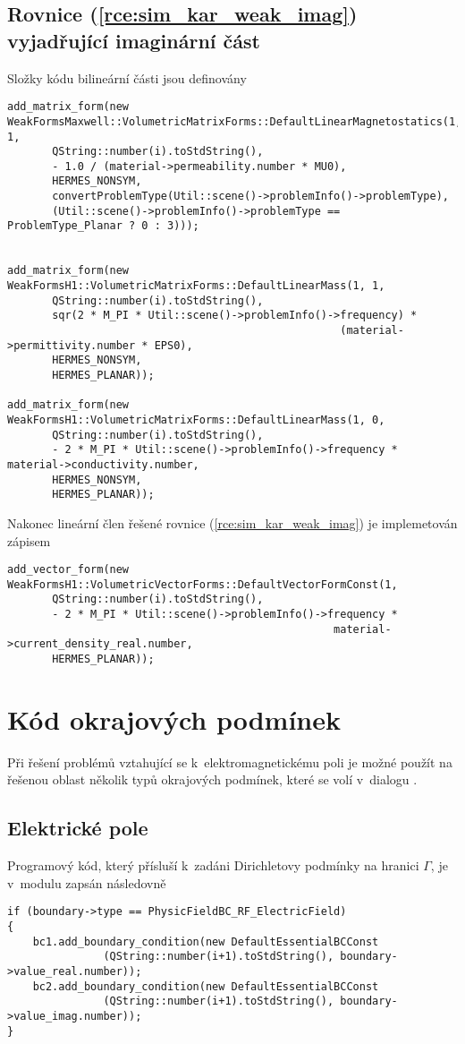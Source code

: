 \subsection*{Rovnice (\ref{rce:sim_kar_weak_imag}) vyjadřující imaginární část}
Složky kódu bilineární části jsou definovány
\begin{verbatim}
add_matrix_form(new WeakFormsMaxwell::VolumetricMatrixForms::DefaultLinearMagnetostatics(1, 1,
       QString::number(i).toStdString(),
       - 1.0 / (material->permeability.number * MU0),
       HERMES_NONSYM,
       convertProblemType(Util::scene()->problemInfo()->problemType),
       (Util::scene()->problemInfo()->problemType == ProblemType_Planar ? 0 : 3)));


add_matrix_form(new WeakFormsH1::VolumetricMatrixForms::DefaultLinearMass(1, 1,
       QString::number(i).toStdString(),
       sqr(2 * M_PI * Util::scene()->problemInfo()->frequency) *
                                                    (material->permittivity.number * EPS0),
       HERMES_NONSYM,
       HERMES_PLANAR));
       
add_matrix_form(new WeakFormsH1::VolumetricMatrixForms::DefaultLinearMass(1, 0,
       QString::number(i).toStdString(),
       - 2 * M_PI * Util::scene()->problemInfo()->frequency * material->conductivity.number,
       HERMES_NONSYM,
       HERMES_PLANAR));
\end{verbatim}
Nakonec lineární člen řešené rovnice (\ref{rce:sim_kar_weak_imag}) je implemetován zápisem
\begin{verbatim}
add_vector_form(new WeakFormsH1::VolumetricVectorForms::DefaultVectorFormConst(1,
       QString::number(i).toStdString(),
       - 2 * M_PI * Util::scene()->problemInfo()->frequency * 
                                                   material->current_density_real.number,
       HERMES_PLANAR));
\end{verbatim}

\section{Kód okrajových podmínek}
Při řešení problémů vztahující se k~elektromagnetickému poli je možné použít na řešenou oblast několik typů okrajových podmínek, které se volí v~dialogu . 

\subsection*{Elektrické pole}
Programový kód, který přísluší k~zadáni Dirichletovy podmínky na hranici $\Gamma$, je v~modulu zapsán následovně
\begin{verbatim}
if (boundary->type == PhysicFieldBC_RF_ElectricField)
{
    bc1.add_boundary_condition(new DefaultEssentialBCConst
               (QString::number(i+1).toStdString(), boundary->value_real.number));
    bc2.add_boundary_condition(new DefaultEssentialBCConst
               (QString::number(i+1).toStdString(), boundary->value_imag.number));
}
\end{verbatim}

